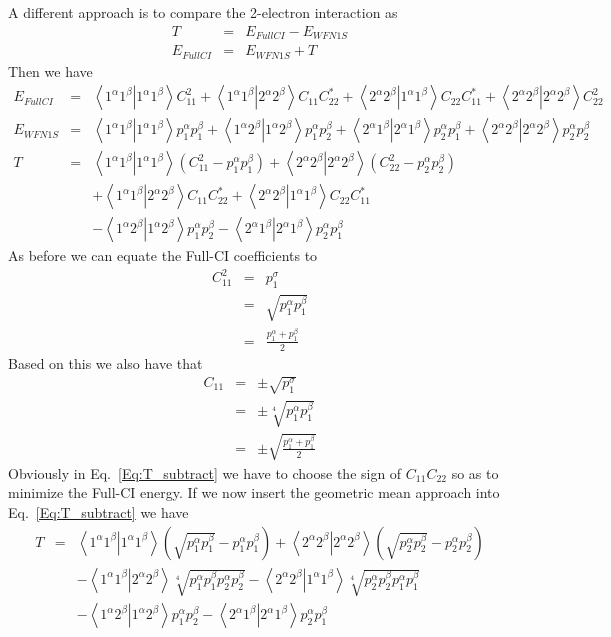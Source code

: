 \documentclass[pra]{revtex4-1}
\newcommand{\eria}[4]{\left\langle #1^\alpha #2^\beta \right.\left| #3^\alpha #4^\beta \right\rangle}
\begin{document}
A different approach is to compare the 2-electron interaction as
\begin{eqnarray}
   T &=& E_{FullCI}-E_{WFN1S} \\
   E_{FullCI} &=& E_{WFN1S}+T
\end{eqnarray}
Then we have
\begin{eqnarray}
   E_{FullCI} &=& \eria{1}{1}{1}{1} C_{11}^2 + \eria{1}{1}{2}{2} C_{11}C_{22}^*
               +  \eria{2}{2}{1}{1} C_{22}C_{11}^* + \eria{2}{2}{2}{2} C_{22}^2 \\
   E_{WFN1S}  &=& \eria{1}{1}{1}{1} p_1^\alpha p_1^\beta + \eria{1}{2}{1}{2} p_1^\alpha p_2^\beta
               +  \eria{2}{1}{2}{1} p_2^\alpha p_1^\beta + \eria{2}{2}{2}{2} p_2^\alpha p_2^\beta \\
   T
   &=& \eria{1}{1}{1}{1} (C_{11}^2-p_1^\alpha p_1^\beta)
    +  \eria{2}{2}{2}{2} (C_{22}^2-p_2^\alpha p_2^\beta) \nonumber \\
   &&+ \eria{1}{1}{2}{2} C_{11}C_{22}^*
    +  \eria{2}{2}{1}{1} C_{22}C_{11}^*       \nonumber \\
   &&- \eria{1}{2}{1}{2} p_1^\alpha p_2^\beta
    -  \eria{2}{1}{2}{1} p_2^\alpha p_1^\beta 
   \label{Eq:T_subtract}
\end{eqnarray}
As before we can equate the Full-CI coefficients to
\begin{eqnarray}
C_{11}^2 &=& p_{1}^\sigma \\
         &=& \sqrt{p_1^\alpha p_1^\beta} \\
         &=& \frac{p_1^\alpha + p_1^\beta}{2}
\end{eqnarray}
Based on this we also have that
\begin{eqnarray}
C_{11} &=& \pm\sqrt{p_{1}^\sigma} \\
       &=& \pm\sqrt[4]{p_1^\alpha p_1^\beta} \\
       &=& \pm\sqrt{\frac{p_1^\alpha + p_1^\beta}{2}}
\end{eqnarray}
Obviously in Eq.~\ref{Eq:T_subtract} we have to choose the sign of $C_{11}C_{22}$ so as to minimize
the Full-CI energy. If we now insert the geometric mean approach into Eq.~\ref{Eq:T_subtract} we have
\begin{eqnarray}
   T
   &=& \eria{1}{1}{1}{1} (\sqrt{p_1^\alpha p_1^\beta}-p_1^\alpha p_1^\beta)
    +  \eria{2}{2}{2}{2} (\sqrt{p_2^\alpha p_2^\beta}-p_2^\alpha p_2^\beta) \nonumber \\
   &&- \eria{1}{1}{2}{2} \sqrt[4]{p_1^\alpha p_1^\beta p_2^\alpha p_2^\beta}
    -  \eria{2}{2}{1}{1} \sqrt[4]{p_2^\alpha p_2^\beta p_1^\alpha p_1^\beta} \nonumber \\
   &&- \eria{1}{2}{1}{2} p_1^\alpha p_2^\beta
    -  \eria{2}{1}{2}{1} p_2^\alpha p_1^\beta 
   \label{Eq:T_subtract_2}
\end{eqnarray}
\end{document}
